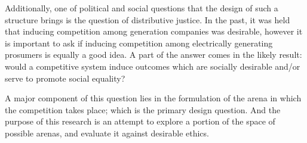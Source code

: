 Additionally, one of political and social questions that the design of such a structure brings is the question of distributive justice.
In the past, it was held that inducing competition among generation companies was desirable, however it is important to ask if inducing competition among electrically generating prosumers is equally a good idea.
A part of the answer comes in the likely result: would a competitive system induce outcomes which are socially desirable and/or serve to promote social equality?

A major component of this question lies in the formulation of the arena in which the competition takes place; which is the primary design question.
And the purpose of this research is an attempt to explore a portion of the space of possible arenas, and evaluate it against desirable ethics.


